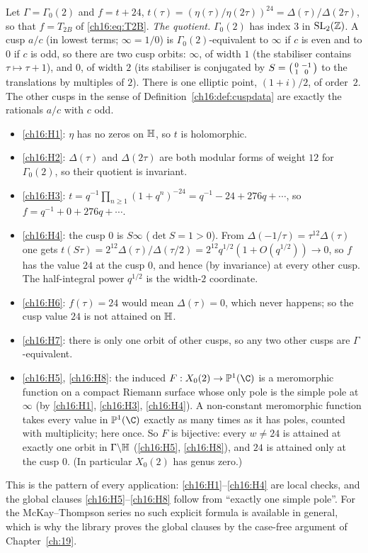 \begin{example}\label{ch16:ex:gamma02}
Let $\Gamma=\Gamma_0(2)$ and $f=t+24$, $t(\tau)=(\eta(\tau)/\eta(2\tau))^{24}=\Delta(\tau)/\Delta(2\tau)$, so that
$f=T_{2B}$ of \eqref{ch16:eq:T2B}.
\emph{The quotient.}  $\Gamma_0(2)$ has index $3$ in $\mathrm{SL}_2(\mathbb{Z})$.  A cusp $a/c$ (in lowest terms; $\infty=1/0$) is
$\Gamma_0(2)$-equivalent to $\infty$ if $c$ is even and to $0$ if $c$ is odd, so there are two cusp orbits: $\infty$, of
width $1$ (the stabiliser contains $\tau\mapsto\tau+1$), and $0$, of width $2$ (its stabiliser is conjugated by
$S=\left(\begin{smallmatrix}0&-1\\1&0\end{smallmatrix}\right)$ to the translations by multiples of $2$).  There is one elliptic point, $(1+i)/2$, of
order~$2$.  The other cusps in the sense of Definition~\ref{ch16:def:cuspdata} are exactly the rationals $a/c$ with
$c$ odd.
\begin{itemize}
\item \ref{ch16:H1}: $\eta$ has no zeros on $\mathbb{H}$, so $t$ is holomorphic.
\item \ref{ch16:H2}: $\Delta(\tau)$ and $\Delta(2\tau)$ are both modular forms of weight $12$ for $\Gamma_0(2)$, so
  their quotient is invariant.
\item \ref{ch16:H3}: $t=q^{-1}\prod_{n\ge1}(1+q^n)^{-24}=q^{-1}-24+276q+\cdots$, so $f=q^{-1}+0+276q+\cdots$.
\item \ref{ch16:H4}: the cusp $0$ is $S\infty$ ($\det S=1>0$).  From $\Delta(-1/\tau)=\tau^{12}\Delta(\tau)$ one gets
  $t(S\tau)=2^{12}\Delta(\tau)/\Delta(\tau/2)=2^{12}q^{1/2}(1+O(q^{1/2}))\to0$, so $f$ has the value $24$ at the cusp
  $0$, and hence (by invariance) at every other cusp.  The half-integral power $q^{1/2}$ is the width-$2$ coordinate.
\item \ref{ch16:H6}: $f(\tau)=24$ would mean $\Delta(\tau)=0$, which never happens; so the cusp value $24$ is not
  attained on $\mathbb{H}$.
\item \ref{ch16:H7}: there is only one orbit of other cusps, so any two other cusps are $\Gamma$-equivalent.
\item \ref{ch16:H5}, \ref{ch16:H8}: the induced $F:X_0(2)\to\chsixteenP(\C)$ is a meromorphic function on a compact
  Riemann surface whose only pole is the simple pole at $\infty$ (by \ref{ch16:H1}, \ref{ch16:H3}, \ref{ch16:H4}).  A
  non-constant meromorphic function takes every value in $\chsixteenP(\C)$ exactly as many times as it has poles,
  counted with multiplicity; here once.  So $F$ is bijective: every $w\ne24$ is attained at exactly one orbit in
  $\Gamma\backslash\mathbb{H}$ (\ref{ch16:H5}, \ref{ch16:H8}), and $24$ is attained only at the cusp $0$.  (In
  particular $X_0(2)$ has genus zero.)
\end{itemize}
This is the pattern of every application: \ref{ch16:H1}--\ref{ch16:H4} are local checks, and the global clauses
\ref{ch16:H5}--\ref{ch16:H8} follow from ``exactly one simple pole''.  For the McKay--Thompson series no such
explicit formula is available in general, which is why the library proves the global clauses by the case-free
argument of Chapter~\ref{ch:19}.
\end{example}

